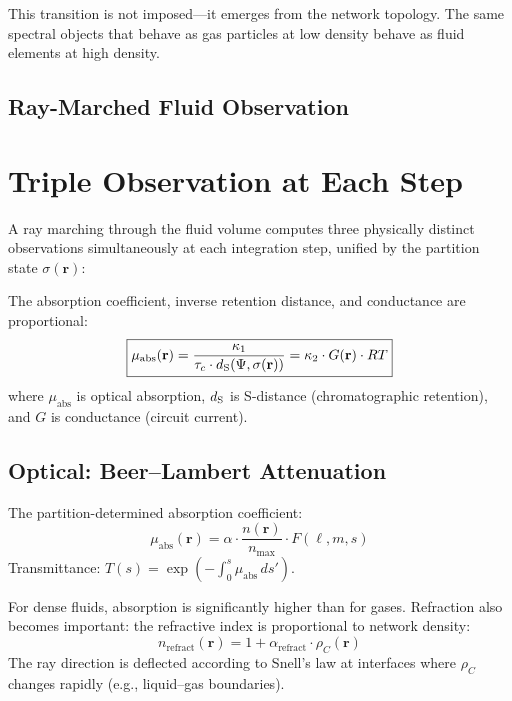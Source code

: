 This transition is not imposed---it emerges from the network topology. The same spectral objects that behave as gas particles at low density behave as fluid elements at high density.


\subsection{Ray-Marched Fluid Observation}
\label{part:ray_march}

\section{Triple Observation at Each Step}
\label{sec:triple_obs}

A ray marching through the fluid volume computes three physically distinct observations simultaneously at each integration step, unified by the partition state $\sigma(\mathbf{r})$:

\begin{theorem}
\label{thm:triple_obs}
The absorption coefficient, inverse retention distance, and conductance are proportional:
\begin{equation}
\boxed{\mu_{\mathrm{abs}}(\mathbf{r}) = \frac{\kappa_1}{\tau_c \cdot d_{\mathrm{S}}(\Psi, \sigma(\mathbf{r}))} = \kappa_2 \cdot G(\mathbf{r}) \cdot RT}
\end{equation}
where $\mu_{\mathrm{abs}}$ is optical absorption, $d_{\mathrm{S}}$ is S-distance (chromatographic retention), and $G$ is conductance (circuit current).
\end{theorem}

\subsection{Optical: Beer--Lambert Attenuation}

The partition-determined absorption coefficient:
\begin{equation}
    \mu_{\mathrm{abs}}(\mathbf{r}) = \alpha \cdot \frac{n(\mathbf{r})}{n_{\max}} \cdot F(\ell, m, s)
\end{equation}
Transmittance: $T(s) = \exp(-\int_0^s \mu_{\mathrm{abs}}\, ds')$.

For dense fluids, absorption is significantly higher than for gases. Refraction also becomes important: the refractive index is proportional to network density:
\begin{equation}
    n_{\mathrm{refract}}(\mathbf{r}) = 1 + \alpha_{\mathrm{refract}} \cdot \rho_C(\mathbf{r})
\end{equation}
The ray direction is deflected according to Snell's law at interfaces where $\rho_C$ changes rapidly (e.g., liquid--gas boundaries).

